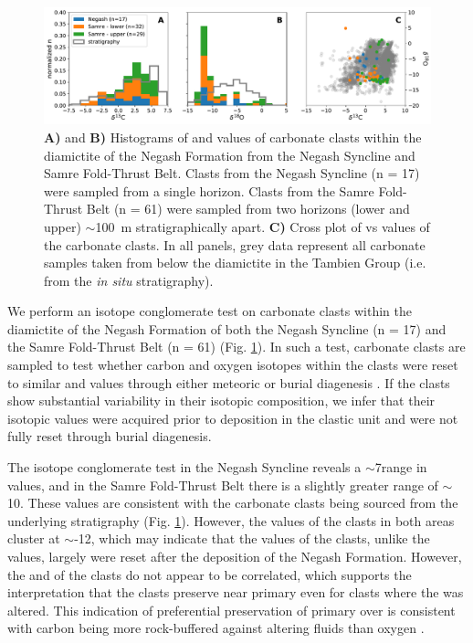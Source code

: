 \begin{figure}[h!]
\begin{center}
	\includegraphics[width=\textwidth]{figures/Tambien/clast-analysis.pdf}
	\caption[Diamictite carbonate clast isotope conglomerate test.]{\textbf{A)} and \textbf{B)} Histograms of \dC and \dO values of carbonate clasts within the diamictite of the Negash Formation from the Negash Syncline and Samre Fold-Thrust Belt. Clasts from the Negash Syncline (n = 17) were sampled from a single horizon. Clasts from the Samre Fold-Thrust Belt (n = 61) were sampled from two horizons (lower and upper) $\sim$100~m stratigraphically apart. \textbf{C)} Cross plot of \dC vs \dO values of the carbonate clasts. In all panels, grey data represent all carbonate samples taken from below the diamictite in the Tambien Group (i.e. from the \textit{in situ} stratigraphy).}
	\label{fig:clast-analysis}
\end{center}
\end{figure}

We perform an isotope conglomerate test on carbonate clasts within the diamictite of the Negash Formation of both the Negash Syncline (n = 17) and the Samre Fold-Thrust Belt (n = 61) (Fig. \ref{fig:clast-analysis}). In such a test, carbonate clasts are sampled to test whether carbon and oxygen isotopes within the clasts were reset to similar \dC and \dO values through either meteoric or burial diagenesis \citep{Husson2012a, Husson2015a}. If the clasts show substantial variability in their isotopic composition, we infer that their isotopic values were acquired prior to deposition in the clastic unit and were not fully reset through burial diagenesis.

The isotope conglomerate test in the Negash Syncline reveals a $\sim$7\permil range in \dC values, and in the Samre Fold-Thrust Belt there is a slightly greater range of $\sim$10\permil. These values are consistent with the carbonate clasts being sourced from the underlying stratigraphy (Fig. \ref{fig:clast-analysis}). However, the \dO values of the clasts in both areas cluster at $\sim$-12\permil, which may indicate that the \dO values of the clasts, unlike the \dC values, largely were reset after the deposition of the Negash Formation. However, the \dC and \dO of the clasts do not appear to be correlated, which supports the interpretation that the clasts preserve near primary \dC even for clasts where the \dO was altered. This indication of preferential preservation of primary \dC over \dO is consistent with carbon being more rock-buffered against altering fluids than oxygen \citep{Banner1990a}.

